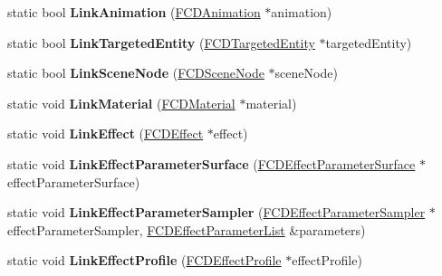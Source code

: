 \begin{DoxyCompactItemize}
\item 
\hypertarget{classFArchiveXML_aa2283f0807dc7bd86d357678ea9f9fb4}{
static bool {\bfseries LinkAnimation} (\hyperlink{classFCDAnimation}{FCDAnimation} $\ast$animation)}
\label{classFArchiveXML_aa2283f0807dc7bd86d357678ea9f9fb4}

\item 
\hypertarget{classFArchiveXML_a2049189584d0b1efb47b793b16358b09}{
static bool {\bfseries LinkTargetedEntity} (\hyperlink{classFCDTargetedEntity}{FCDTargetedEntity} $\ast$targetedEntity)}
\label{classFArchiveXML_a2049189584d0b1efb47b793b16358b09}

\item 
\hypertarget{classFArchiveXML_a2a18b5e37b81d8912ae6b9910e953538}{
static bool {\bfseries LinkSceneNode} (\hyperlink{classFCDSceneNode}{FCDSceneNode} $\ast$sceneNode)}
\label{classFArchiveXML_a2a18b5e37b81d8912ae6b9910e953538}

\item 
\hypertarget{classFArchiveXML_ad5a50dfd0cad6b09a6eb087554b1bb34}{
static void {\bfseries LinkMaterial} (\hyperlink{classFCDMaterial}{FCDMaterial} $\ast$material)}
\label{classFArchiveXML_ad5a50dfd0cad6b09a6eb087554b1bb34}

\item 
\hypertarget{classFArchiveXML_ae4a2da5304f0dbcae547bd12612ba201}{
static void {\bfseries LinkEffect} (\hyperlink{classFCDEffect}{FCDEffect} $\ast$effect)}
\label{classFArchiveXML_ae4a2da5304f0dbcae547bd12612ba201}

\item 
\hypertarget{classFArchiveXML_a5e1d8508feb0480b2af04f085f852644}{
static void {\bfseries LinkEffectParameterSurface} (\hyperlink{classFCDEffectParameterSurface}{FCDEffectParameterSurface} $\ast$effectParameterSurface)}
\label{classFArchiveXML_a5e1d8508feb0480b2af04f085f852644}

\item 
\hypertarget{classFArchiveXML_ae5e7f79e96acedf504819447f0a95e7d}{
static void {\bfseries LinkEffectParameterSampler} (\hyperlink{classFCDEffectParameterSampler}{FCDEffectParameterSampler} $\ast$effectParameterSampler, \hyperlink{classfm_1_1pvector}{FCDEffectParameterList} \&parameters)}
\label{classFArchiveXML_ae5e7f79e96acedf504819447f0a95e7d}

\item 
\hypertarget{classFArchiveXML_a220022712dbe7a2b82ae8c4b4263526d}{
static void {\bfseries LinkEffectProfile} (\hyperlink{classFCDEffectProfile}{FCDEffectProfile} $\ast$effectProfile)}
\label{classFArchiveXML_a220022712dbe7a2b82ae8c4b4263526d}


\end{DoxyCompactItemize}

